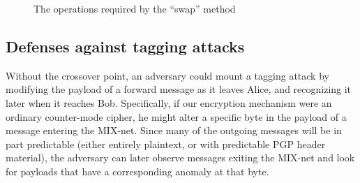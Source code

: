 \documentclass{llncs}
\begin{document}

%


\begin{figure}
\begin{center}
\caption{The operations required by the ``swap'' method} 
\end{center}
\end{figure}


\subsection{Defenses against tagging attacks}
\label{subsec:tagging}

Without the crossover point, an adversary could mount a tagging
attack by modifying the payload of a forward message as
it leaves Alice, and recognizing it later when it reaches Bob.
Specifically, if our encryption mechanism were an ordinary
counter-mode cipher, he might alter a specific byte in the payload of
a message entering the MIX-net. Since many of the outgoing messages
will be in part predictable (either entirely plaintext, or with
predictable PGP header material), the adversary can later observe
messages exiting the MIX-net and look for payloads that have a
corresponding anomaly at that byte.
\end{document}
